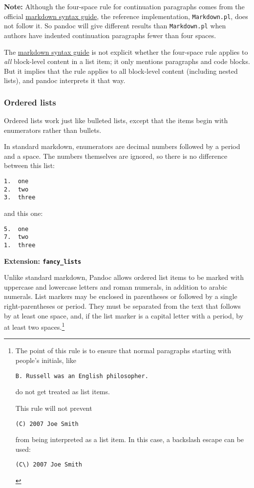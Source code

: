 \documentclass[]{article}
\begin{document}
\textbf{Note:} Although the four-space rule for continuation paragraphs
comes from the official
\href{http://daringfireball.net/projects/markdown/syntax\#list}{markdown
syntax guide}, the reference implementation, \texttt{Markdown.pl}, does
not follow it. So pandoc will give different results than
\texttt{Markdown.pl} when authors have indented continuation paragraphs
fewer than four spaces.

The
\href{http://daringfireball.net/projects/markdown/syntax\#list}{markdown
syntax guide} is not explicit whether the four-space rule applies to
\emph{all} block-level content in a list item; it only mentions
paragraphs and code blocks. But it implies that the rule applies to all
block-level content (including nested lists), and pandoc interprets it
that way.

\subsubsection{Ordered lists}

Ordered lists work just like bulleted lists, except that the items begin
with enumerators rather than bullets.

In standard markdown, enumerators are decimal numbers followed by a
period and a space. The numbers themselves are ignored, so there is no
difference between this list:

\begin{verbatim}
1.  one
2.  two
3.  three
\end{verbatim}

and this one:

\begin{verbatim}
5.  one
7.  two
1.  three
\end{verbatim}

\textbf{Extension: \texttt{fancy\_lists}}

Unlike standard markdown, Pandoc allows ordered list items to be marked
with uppercase and lowercase letters and roman numerals, in addition to
arabic numerals. List markers may be enclosed in parentheses or followed
by a single right-parentheses or period. They must be separated from the
text that follows by at least one space, and, if the list marker is a
capital letter with a period, by at least two spaces.\footnote{The point
  of this rule is to ensure that normal paragraphs starting with
  people's initials, like

\begin{Verbatim}
B. Russell was an English philosopher.
\end{Verbatim}

  do not get treated as list items.

  This rule will not prevent

\begin{Verbatim}
(C) 2007 Joe Smith
\end{Verbatim}

  from being interpreted as a list item. In this case, a backslash
  escape can be used:

\begin{Verbatim}
(C\) 2007 Joe Smith
\end{Verbatim}
}
\end{document}
